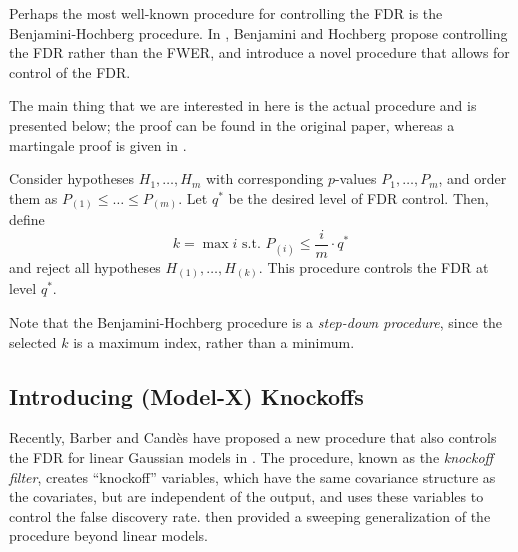\documentclass[12pt,reqno]{amsart}
\numberwithin{equation}{section}
\begin{document}
Perhaps the most well-known procedure for controlling the FDR is the Benjamini-Hochberg procedure. In \cite{bh}, Benjamini and Hochberg propose controlling the FDR rather than the FWER, and introduce a novel procedure that allows for control of the FDR.

The main thing that we are interested in here is the actual procedure and is presented below; the proof can be found in the original paper, whereas a martingale proof is given in \cite{stat300}.
\begin{theorem}
Consider hypotheses $H_1, \ldots, H_m$ with corresponding $p$-values $P_1, \ldots, P_m$, and order them as $P_{(1)} \leq \ldots \leq P_{(m)}$. Let $q^*$ be the desired level of FDR control. Then, define
\[ k = \max i \text{ s.t. } P_{(i)} \leq \frac{i}{m} \cdot q^{*} \] and reject all hypotheses $H_{(1)}, \ldots, H_{(k)}$. This procedure controls the FDR at level $q^*$. 
\end{theorem}
Note that the Benjamini-Hochberg procedure is a \emph{step-down procedure}, since the selected $k$ is a maximum index, rather than a minimum.


\subsection{Introducing (Model-X) Knockoffs}
Recently, Barber and Cand\`{e}s have proposed a new procedure that also controls the FDR for linear Gaussian models in \cite{knockoffs}. The procedure, known as the \emph{knockoff filter}, creates ``knockoff'' variables, which have the same covariance structure as the covariates, but are independent of the output, and uses these variables to control the false discovery rate. \cite{panning} then provided a sweeping generalization of the procedure beyond linear models.

\end{document}
